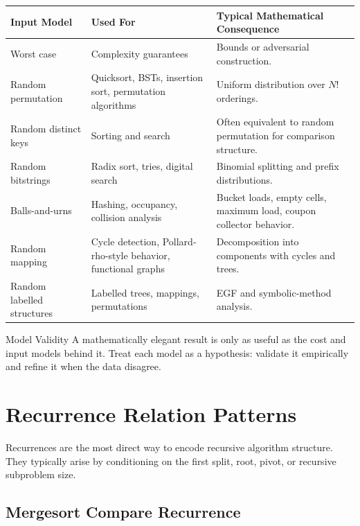 \documentclass[11pt]{article}
\begin{document}
\begin{center}
\begin{tabularx}{\textwidth}{L{0.24\textwidth} L{0.30\textwidth} Y}
\toprule
\textbf{Input Model} & \textbf{Used For} & \textbf{Typical Mathematical Consequence} \\
\midrule
Worst case & Complexity guarantees & Bounds or adversarial construction. \\
Random permutation & Quicksort, BSTs, insertion sort, permutation algorithms & Uniform distribution over \(N!\) orderings. \\
Random distinct keys & Sorting and search & Often equivalent to random permutation for comparison structure. \\
Random bitstrings & Radix sort, tries, digital search & Binomial splitting and prefix distributions. \\
Balls-and-urns & Hashing, occupancy, collision analysis & Bucket loads, empty cells, maximum load, coupon collector behavior. \\
Random mapping & Cycle detection, Pollard-rho-style behavior, functional graphs & Decomposition into components with cycles and trees. \\
Random labelled structures & Labelled trees, mappings, permutations & EGF and symbolic-method analysis. \\
\bottomrule
\end{tabularx}
\end{center}

\begin{warningbox}{Model Validity}
A mathematically elegant result is only as useful as the cost and input models behind it. Treat each model as a hypothesis: validate it empirically and refine it when the data disagree.
\end{warningbox}

\section{Recurrence Relation Patterns}

Recurrences are the most direct way to encode recursive algorithm structure. They typically arise by conditioning on the first split, root, pivot, or recursive subproblem size.

\subsection{Mergesort Compare Recurrence}
\end{document}
